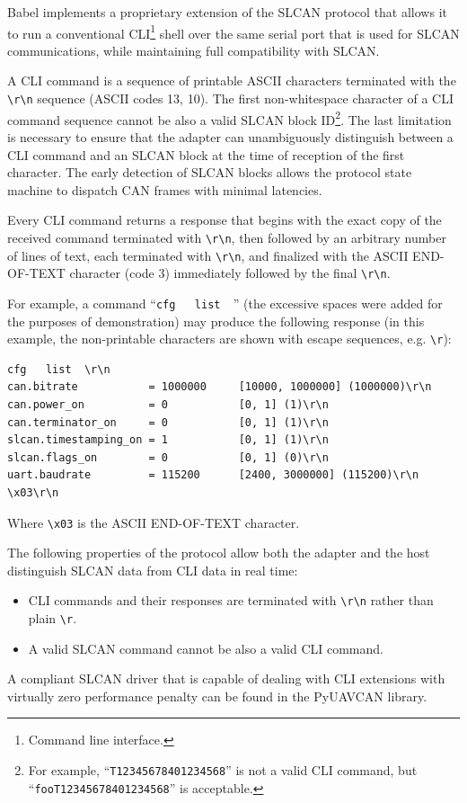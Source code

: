 \documentclass{zubaxdoc}
\begin{document}
Babel implements a proprietary extension of the SLCAN protocol that allows it to run a conventional
CLI\footnote{Command line interface.} shell over the same serial port that is used for SLCAN communications,
while maintaining full compatibility with SLCAN.

A CLI command is a sequence of printable ASCII characters terminated with the
\verb|\r\n| sequence (ASCII codes 13, 10).
The first non-whitespace character of a CLI command sequence cannot be also a valid
SLCAN block ID\footnote{For example, ``\texttt{T12345678401234568}'' is not a valid CLI command,
but ``\texttt{fooT12345678401234568}'' is acceptable.}.
The last limitation is necessary to ensure that the adapter can unambiguously distinguish between
a CLI command and an SLCAN block at the time of reception of the first character.
The early detection of SLCAN blocks allows the protocol state machine to dispatch CAN frames with
minimal latencies.

Every CLI command returns a response that begins with the exact copy of the received command terminated with
\verb|\r\n|,
then followed by an arbitrary number of lines of text,
each terminated with \verb|\r\n|,
and finalized with the ASCII END-OF-TEXT character (code 3) immediately followed by the final
\verb|\r\n|.

For example, a command ``\verb|cfg   list  |'' (the excessive spaces were added for the purposes of demonstration)
may produce the following response (in this example, the non-printable characters are shown with escape sequences,
e.g. \verb|\r|):

\begin{verbatim}
cfg   list  \r\n
can.bitrate           = 1000000     [10000, 1000000] (1000000)\r\n
can.power_on          = 0           [0, 1] (1)\r\n
can.terminator_on     = 0           [0, 1] (1)\r\n
slcan.timestamping_on = 1           [0, 1] (1)\r\n
slcan.flags_on        = 0           [0, 1] (0)\r\n
uart.baudrate         = 115200      [2400, 3000000] (115200)\r\n
\x03\r\n
\end{verbatim}

Where \verb|\x03| is the ASCII END-OF-TEXT character.

The following properties of the protocol allow both the adapter and the host
distinguish SLCAN data from CLI data in real time:
\begin{itemize}
    \item CLI commands and their responses are terminated with \verb|\r\n| rather than plain \verb|\r|.
    \item A valid SLCAN command cannot be also a valid CLI command.
\end{itemize}
A compliant SLCAN driver that is capable of dealing with CLI extensions with virtually zero performance penalty
can be found in the PyUAVCAN library.
\end{document}
